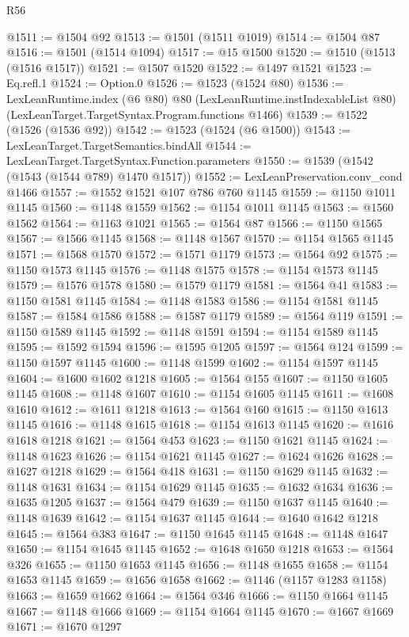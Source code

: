 \begin{lexlean}{R56}
\begin{coremodule}
@1511 := @1504 @92
@1513 := @1501 (@1511 @1019)
@1514 := @1504 @87
@1516 := @1501 (@1514 @1094)
@1517 := @15 @1500
@1520 := @1510 (@1513 (@1516 @1517))
@1521 := @1507 @1520
@1522 := @1497 @1521
@1523 := Eq.refl.{1}
@1524 := Option.{0}
@1526 := @1523 (@1524 @80)
@1536 := LexLeanRuntime.index
    (@6 @80)
    @80
    (LexLeanRuntime.instIndexableList @80)
    (LexLeanTarget.TargetSyntax.Program.functions @1466)
@1539 := @1522 (@1526 (@1536 @92))
@1542 := @1523 (@1524 (@6 @1500))
@1543 := LexLeanTarget.TargetSemantics.bindAll
@1544 := LexLeanTarget.TargetSyntax.Function.parameters
@1550 := @1539 (@1542 (@1543 (@1544 @789) @1470 @1517))
@1552 := LexLeanPreservation.conv_cond @1466
@1557 := @1552 @1521 @107 @786 @760 @1145
@1559 := @1150 @1011 @1145
@1560 := @1148 @1559
@1562 := @1154 @1011 @1145
@1563 := @1560 @1562
@1564 := @1163 @1021
@1565 := @1564 @87
@1566 := @1150 @1565
@1567 := @1566 @1145
@1568 := @1148 @1567
@1570 := @1154 @1565 @1145
@1571 := @1568 @1570
@1572 := @1571 @1179
@1573 := @1564 @92
@1575 := @1150 @1573 @1145
@1576 := @1148 @1575
@1578 := @1154 @1573 @1145
@1579 := @1576 @1578
@1580 := @1579 @1179
@1581 := @1564 @41
@1583 := @1150 @1581 @1145
@1584 := @1148 @1583
@1586 := @1154 @1581 @1145
@1587 := @1584 @1586
@1588 := @1587 @1179
@1589 := @1564 @119
@1591 := @1150 @1589 @1145
@1592 := @1148 @1591
@1594 := @1154 @1589 @1145
@1595 := @1592 @1594
@1596 := @1595 @1205
@1597 := @1564 @124
@1599 := @1150 @1597 @1145
@1600 := @1148 @1599
@1602 := @1154 @1597 @1145
@1604 := @1600 @1602 @1218
@1605 := @1564 @155
@1607 := @1150 @1605 @1145
@1608 := @1148 @1607
@1610 := @1154 @1605 @1145
@1611 := @1608 @1610
@1612 := @1611 @1218
@1613 := @1564 @160
@1615 := @1150 @1613 @1145
@1616 := @1148 @1615
@1618 := @1154 @1613 @1145
@1620 := @1616 @1618 @1218
@1621 := @1564 @453
@1623 := @1150 @1621 @1145
@1624 := @1148 @1623
@1626 := @1154 @1621 @1145
@1627 := @1624 @1626
@1628 := @1627 @1218
@1629 := @1564 @418
@1631 := @1150 @1629 @1145
@1632 := @1148 @1631
@1634 := @1154 @1629 @1145
@1635 := @1632 @1634
@1636 := @1635 @1205
@1637 := @1564 @479
@1639 := @1150 @1637 @1145
@1640 := @1148 @1639
@1642 := @1154 @1637 @1145
@1644 := @1640 @1642 @1218
@1645 := @1564 @383
@1647 := @1150 @1645 @1145
@1648 := @1148 @1647
@1650 := @1154 @1645 @1145
@1652 := @1648 @1650 @1218
@1653 := @1564 @326
@1655 := @1150 @1653 @1145
@1656 := @1148 @1655
@1658 := @1154 @1653 @1145
@1659 := @1656 @1658
@1662 := @1146 (@1157 @1283 @1158)
@1663 := @1659 @1662
@1664 := @1564 @346
@1666 := @1150 @1664 @1145
@1667 := @1148 @1666
@1669 := @1154 @1664 @1145
@1670 := @1667 @1669
@1671 := @1670 @1297

\end{coremodule}
\end{lexlean}
